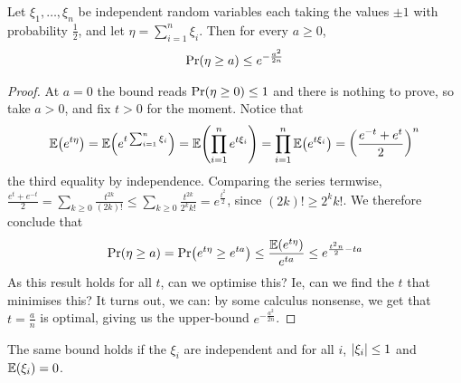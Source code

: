 \begin{boxtheorem}\label{Ch4:Thm:Chernoff-Half}
    Let $\xi_1, \ldots, \xi_n$ be independent random variables each taking the values $\pm 1$ with probability $\frac{1}{2}$, and let $\eta = \sum_{i=1}^{n} \xi_i$. Then for every $a \geq 0$,
    \begin{align*}
        \Pr\!\left( \eta \geq a \right) \leq e^{-\frac{a^2}{2n}}
    \end{align*}
\end{boxtheorem}
\begin{proof}
    At $a = 0$ the bound reads $\Pr\!\left( \eta \geq 0 \right) \leq 1$ and there is nothing to prove, so take $a > 0$, and fix $t > 0$ for the moment. Notice that
    \begin{align}
        \mathbb{E}\!\left( e^{t \eta} \right)
        = \mathbb{E}\!\left( e^{t \sum_{i=1}^{n} \xi_i} \right)
        = \mathbb{E}\!\left( \prod_{i=1}^{n} e^{t \xi_i} \right)
        = \prod_{i=1}^{n} \mathbb{E}\!\left( e^{t \xi_i} \right)
        = \left( \frac{e^{-t} + e^{t}}{2} \right)^{n}
        \label{Ch4:eq:Chernoff-half-equality-chain}
    \end{align}
    the third equality by independence. Comparing the series termwise, $\frac{e^{t} + e^{-t}}{2} = \sum_{k \geq 0} \frac{t^{2k}}{(2k)!} \leq \sum_{k \geq 0} \frac{t^{2k}}{2^k k!} = e^{\frac{t^2}{2}}$, since $(2k)! \geq 2^k k!$. We therefore conclude that
    \begin{align*}
        \Pr\!\left( \eta \geq a \right)
        = \Pr\!\left( e^{t\eta} \geq e^{ta} \right)
        \leq \frac{\mathbb{E}\!\left( e^{t \eta} \right)}{e^{ta}}
        \leq e^{\frac{t^2 n}{2} - ta}
    \end{align*}
    As this result holds for all $t$, can we optimise this? Ie, can we find the $t$ that minimises this? It turns out, we can: by some calculus nonsense, we get that $t = \frac{a}{n}$ is optimal, giving us the upper-bound $e^{-\frac{a^2}{2n}}$.
\end{proof}

The same bound holds if the $\xi_i$ are independent and for all $i$, $\left\lvert \xi_i \right\rvert \leq 1$ and $\mathbb{E}\!\left( \xi_i \right) = 0$.

